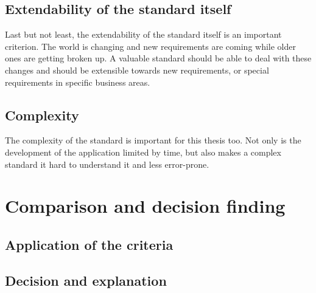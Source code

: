 \documentclass[english,mt]{lmedoc}
\begin{document}
\subsection{Extendability of the standard itself}
\label{sec2.2.4}
Last but not least, the extendability of the standard itself is an important criterion. The world is changing and new requirements are coming while older ones are getting broken up. A valuable standard should be able to deal with these changes and should be extensible towards new requirements, or special requirements in specific business areas.

\subsection{Complexity}
\label{sec2.2.5}
The complexity of the standard is important for this thesis too. Not only is the development of the application limited by time, but also makes a complex standard it hard to understand it and less error-prone.

\section{Comparison and decision finding}
\label{sec2.3}

\subsection{Application of the criteria}
\label{sec2.3.1}

\subsection{Decision and explanation}
\label{sec2.3.2}


\appendix
\cleardoublepage
\cleardoublepage
\cleardoublepage
\cleardoublepage

\cleardoublepage

\cleardoublepage

\nocite{*}

\end{document}
